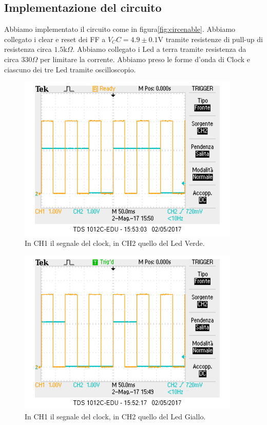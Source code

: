 \documentclass[10pt,a4paper]{article}
\begin{document}
\subsection{Implementazione del circuito}
Abbiamo implementato il circuito come in figura\ref{fig:circenable}.
Abbiamo collegato i clear e reset dei FF a $V_CC = 4.9\pm0.1 $V tramite resistenze di pull-up di resistenza circa $1.5\mbox{k}\Omega$.
Abbiamo collegato i Led a terra tramite resistenza da circa $330\Omega$ per limitare la corrente.  
Abbiamo preso le forme d'onda di Clock e ciascuno dei tre Led tramite oscilloscopio.
\begin{figure}[!htb]
\centering
\includegraphics[scale=0.7]{clock-verde.png}
\caption{In CH1 il segnale del clock, in CH2 quello del Led Verde.\label{fig:verde}}
\end{figure}

\begin{figure}[!htb]
\centering
\includegraphics[scale=0.7]{clock-gialloverde.png}
\caption{In CH1 il segnale del clock, in CH2 quello del Led Giallo.\label{fig:giallo}}
\end{figure}
\end{document}
